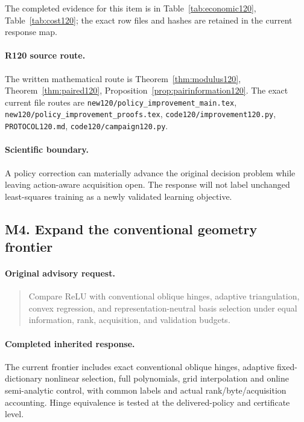The completed evidence for this item is in Table~\ref{tab:economic120}, Table~\ref{tab:cost120}; the exact row files and hashes are retained in the current response map.
\paragraph{R120 source route.}
The written mathematical route is Theorem~\ref{thm:modulus120}, Theorem~\ref{thm:paired120}, Proposition~\ref{prop:pairinformation120}. The exact current file routes are \nolinkurl{new120/policy_improvement_main.tex}, \nolinkurl{new120/policy_improvement_proofs.tex}, \nolinkurl{code120/improvement120.py}, \nolinkurl{PROTOCOL120.md}, \nolinkurl{code120/campaign120.py}.
\paragraph{Scientific boundary.}
A policy correction can materially advance the original decision problem while leaving action-aware acquisition open. The response will not label unchanged least-squares training as a newly validated learning objective.

\subsection{M4. Expand the conventional geometry frontier}
\label{response120:M4}
\paragraph{Original advisory request.}
\begin{quote}
Compare ReLU with conventional oblique hinges, adaptive triangulation, convex regression, and representation-neutral basis selection under equal information, rank, acquisition, and validation budgets.
\end{quote}
\paragraph{Completed inherited response.}
The current frontier includes exact conventional oblique hinges, adaptive fixed-dictionary nonlinear selection, full polynomials, grid interpolation and online semi-analytic control, with common labels and actual rank/byte/acquisition accounting. Hinge equivalence is tested at the delivered-policy and certificate level.

